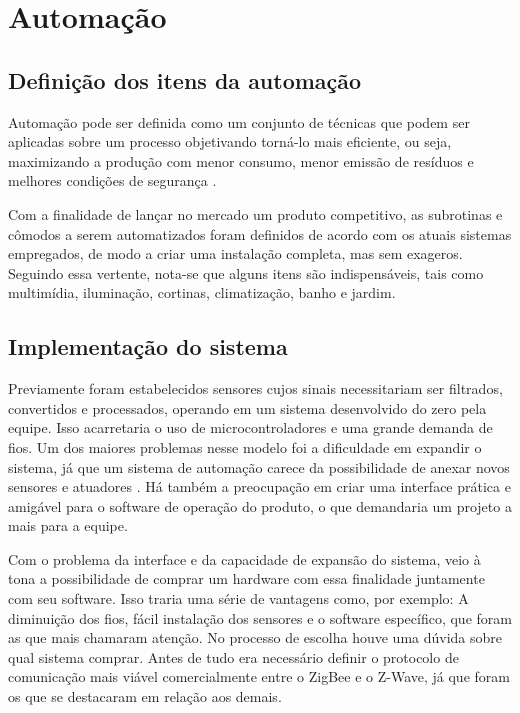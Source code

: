 \chapter{Automação}

\section{Definição dos itens da automação}

	Automação pode ser definida como um conjunto de técnicas que podem ser aplicadas sobre um processo objetivando torná-lo mais eficiente, ou seja, maximizando a produção com menor consumo, menor emissão de resíduos e melhores condições de segurança \cite{2009AutomacaoMarilia}.

	Com a finalidade de lançar no mercado um produto competitivo, as subrotinas e cômodos a serem automatizados foram definidos de acordo com os atuais sistemas empregados, de modo a criar uma instalação completa, mas sem exageros. Seguindo essa vertente, nota-se que alguns itens são indispensáveis, tais como multimídia, iluminação, cortinas, climatização, banho e jardim.

\section{Implementação do sistema}

	Previamente foram estabelecidos sensores cujos sinais necessitariam ser filtrados, convertidos e processados, operando em um sistema desenvolvido do zero pela equipe. Isso acarretaria o uso de microcontroladores e uma grande demanda de fios. Um dos maiores problemas nesse modelo foi a dificuldade em expandir o sistema, já que um sistema de automação carece da possibilidade de anexar novos sensores e atuadores \cite{2009Montgomery}. Há também a preocupação em criar uma interface prática e amigável para o software de operação do produto, o que demandaria um projeto a mais para a equipe. 

	Com o problema da interface e da capacidade de expansão do sistema, veio à tona a possibilidade de comprar um hardware com essa finalidade juntamente com seu software. Isso traria uma série de vantagens como, por exemplo: A diminuição dos fios, fácil instalação dos sensores e o software específico, que foram as que mais chamaram atenção. No processo de escolha houve uma dúvida sobre qual sistema comprar. Antes de tudo era necessário definir o protocolo de comunicação mais viável comercialmente entre o ZigBee e o Z-Wave, já que foram os que se destacaram em relação aos demais.


